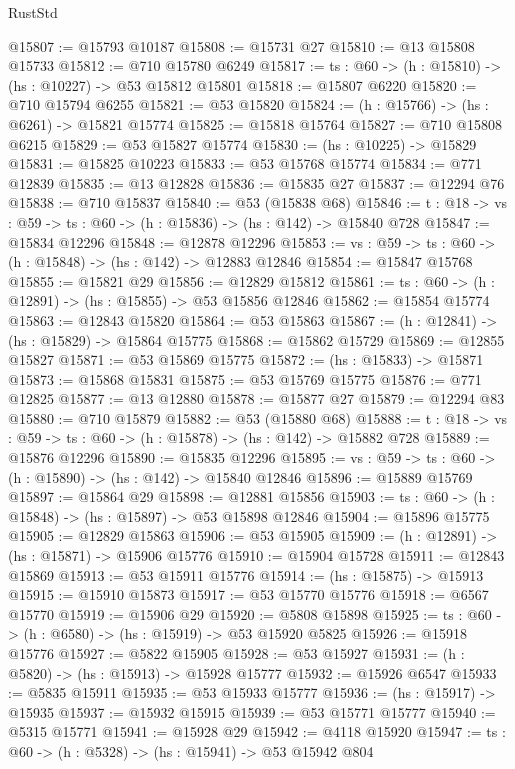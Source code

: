 \begin{lexlean}{RustStd}
\begin{coremodule}
@15807 := @15793 @10187
@15808 := @15731 @27
@15810 := @13 @15808 @15733
@15812 := @710 @15780 @6249
@15817 := {ts : @60} -> (h : @15810) -> (hs : @10227) -> @53 @15812 @15801
@15818 := @15807 @6220
@15820 := @710 @15794 @6255
@15821 := @53 @15820
@15824 := (h : @15766) -> (hs : @6261) -> @15821 @15774
@15825 := @15818 @15764
@15827 := @710 @15808 @6215
@15829 := @53 @15827 @15774
@15830 := (hs : @10225) -> @15829
@15831 := @15825 @10223
@15833 := @53 @15768 @15774
@15834 := @771 @12839
@15835 := @13 @12828
@15836 := @15835 @27
@15837 := @12294 @76
@15838 := @710 @15837
@15840 := @53 (@15838 @68)
@15846 := {t : @18} -> {vs : @59} -> {ts : @60} -> (h : @15836) -> (hs : @142) -> @15840 @728
@15847 := @15834 @12296
@15848 := @12878 @12296
@15853 := {vs : @59} -> {ts : @60} -> (h : @15848) -> (hs : @142) -> @12883 @12846
@15854 := @15847 @15768
@15855 := @15821 @29
@15856 := @12829 @15812
@15861 := {ts : @60} -> (h : @12891) -> (hs : @15855) -> @53 @15856 @12846
@15862 := @15854 @15774
@15863 := @12843 @15820
@15864 := @53 @15863
@15867 := (h : @12841) -> (hs : @15829) -> @15864 @15775
@15868 := @15862 @15729
@15869 := @12855 @15827
@15871 := @53 @15869 @15775
@15872 := (hs : @15833) -> @15871
@15873 := @15868 @15831
@15875 := @53 @15769 @15775
@15876 := @771 @12825
@15877 := @13 @12880
@15878 := @15877 @27
@15879 := @12294 @83
@15880 := @710 @15879
@15882 := @53 (@15880 @68)
@15888 := {t : @18} -> {vs : @59} -> {ts : @60} -> (h : @15878) -> (hs : @142) -> @15882 @728
@15889 := @15876 @12296
@15890 := @15835 @12296
@15895 := {vs : @59} -> {ts : @60} -> (h : @15890) -> (hs : @142) -> @15840 @12846
@15896 := @15889 @15769
@15897 := @15864 @29
@15898 := @12881 @15856
@15903 := {ts : @60} -> (h : @15848) -> (hs : @15897) -> @53 @15898 @12846
@15904 := @15896 @15775
@15905 := @12829 @15863
@15906 := @53 @15905
@15909 := (h : @12891) -> (hs : @15871) -> @15906 @15776
@15910 := @15904 @15728
@15911 := @12843 @15869
@15913 := @53 @15911 @15776
@15914 := (hs : @15875) -> @15913
@15915 := @15910 @15873
@15917 := @53 @15770 @15776
@15918 := @6567 @15770
@15919 := @15906 @29
@15920 := @5808 @15898
@15925 := {ts : @60} -> (h : @6580) -> (hs : @15919) -> @53 @15920 @5825
@15926 := @15918 @15776
@15927 := @5822 @15905
@15928 := @53 @15927
@15931 := (h : @5820) -> (hs : @15913) -> @15928 @15777
@15932 := @15926 @6547
@15933 := @5835 @15911
@15935 := @53 @15933 @15777
@15936 := (hs : @15917) -> @15935
@15937 := @15932 @15915
@15939 := @53 @15771 @15777
@15940 := @5315 @15771
@15941 := @15928 @29
@15942 := @4118 @15920
@15947 := {ts : @60} -> (h : @5328) -> (hs : @15941) -> @53 @15942 @804

\end{coremodule}
\end{lexlean}
